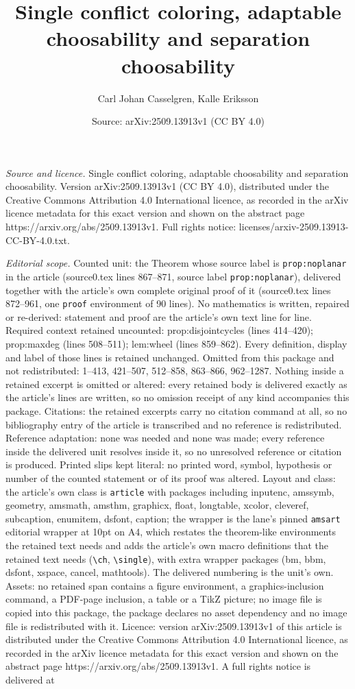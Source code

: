 \documentclass[10pt,a4paper]{amsart}
\title[Single conflict coloring, adaptable choosability and separat]{Single conflict coloring, adaptable choosability and separation choosability}
\author{Carl Johan Casselgren, Kalle Eriksson}
\date{Source: arXiv:2509.13913v1 (CC BY 4.0)}
\begin{document}
\maketitle

\noindent\emph{Source and licence.} Single conflict coloring, adaptable choosability and separation choosability. Version arXiv:2509.13913v1 (CC BY 4.0), distributed under the Creative Commons Attribution 4.0 International licence, as recorded in the arXiv licence metadata for this exact version and shown on the abstract page https://arxiv.org/abs/2509.13913v1. Full rights notice: licenses/arxiv-2509.13913-CC-BY-4.0.txt.\par\smallskip

\noindent\textit{Editorial scope.} Counted unit: the Theorem whose source label is \texttt{prop:noplanar} in the article (source0.tex lines 867--871, source label \texttt{prop:noplanar}), delivered together with the article's own complete original proof of it (source0.tex lines 872--961, one \texttt{proof} environment of 90 lines). No mathematics is written, repaired or re-derived: statement and proof are the article's own text line for line. Required context retained uncounted: prop:disjointcycles (lines 414--420); prop:maxdeg (lines 508--511); lem:wheel (lines 859--862). Every definition, display and label of those lines is retained unchanged. Omitted from this package and not redistributed: 1--413, 421--507, 512--858, 863--866, 962--1287. Nothing inside a retained excerpt is omitted or altered: every retained body is delivered exactly as the article's lines are written, so no omission receipt of any kind accompanies this package. Citations: the retained excerpts carry no citation command at all, so no bibliography entry of the article is transcribed and no reference is redistributed. Reference adaptation: none was needed and none was made; every reference inside the delivered unit resolves inside it, so no unresolved reference or citation is produced. Printed slips kept literal: no printed word, symbol, hypothesis or number of the counted statement or of its proof was altered. Layout and class: the article's own class is \texttt{article} with packages including inputenc, amssymb, geometry, amsmath, amsthm, graphicx, float, longtable, xcolor, cleveref, subcaption, enumitem, dsfont, caption; the wrapper is the lane's pinned \texttt{amsart} editorial wrapper at 10pt on A4, which restates the theorem-like environments the retained text needs and adds the article's own macro definitions that the retained text needs (\texttt{\textbackslash ch}, \texttt{\textbackslash single}), with extra wrapper packages (bm, bbm, dsfont, xspace, cancel, mathtools). The delivered numbering is the unit's own. Assets: no retained span contains a figure environment, a graphics-inclusion command, a PDF-page inclusion, a table or a TikZ picture; no image file is copied into this package, the package declares no asset dependency and no image file is redistributed with it. Licence: version arXiv:2509.13913v1 of this article is distributed under the Creative Commons Attribution 4.0 International licence, as recorded in the arXiv licence metadata for this exact version and shown on the abstract page https://arxiv.org/abs/2509.13913v1. A full rights notice is delivered at 
\end{document}
